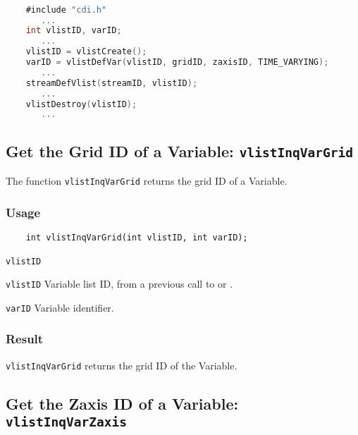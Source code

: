\begin{lstlisting}[language=C, backgroundcolor=\color{pyellow}, basicstyle=\small, columns=flexible]

    #include "cdi.h"
       ...
    int vlistID, varID;
       ...
    vlistID = vlistCreate();
    varID = vlistDefVar(vlistID, gridID, zaxisID, TIME_VARYING);
       ...
    streamDefVlist(streamID, vlistID);
       ...
    vlistDestroy(vlistID);
       ...
\end{lstlisting}


\subsection{Get the Grid ID of a Variable: \texttt{vlistInqVarGrid}}
\label{vlistInqVarGrid}

The function {\texttt{vlistInqVarGrid}} returns the grid ID of a Variable.

\subsubsection*{Usage}

\begin{verbatim}
    int vlistInqVarGrid(int vlistID, int varID);
\end{verbatim}

\hspace*{4mm}\begin{minipage}[]{15cm}
\begin{deflist}{\texttt{vlistID}\ }
\item[\texttt{vlistID}]
Variable list ID, from a previous call to {} or {}.
\item[\texttt{varID}]
Variable identifier.

\end{deflist}
\end{minipage}

\subsubsection*{Result}

{\texttt{vlistInqVarGrid}} returns the grid ID of the Variable.



\subsection{Get the Zaxis ID of a Variable: \texttt{vlistInqVarZaxis}}
\label{vlistInqVarZaxis}


